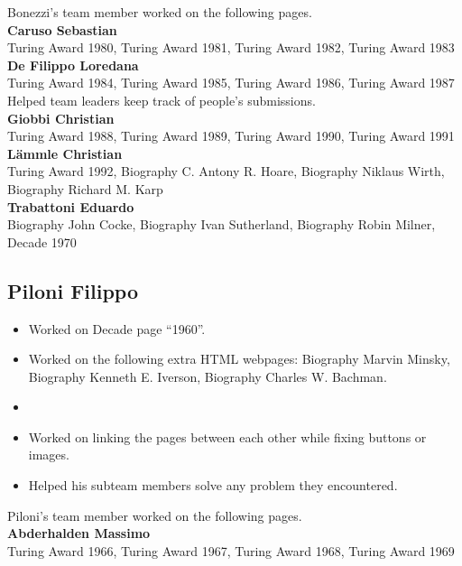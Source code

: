 \documentclass[11pt]{article}
\begin{document}
\noindent Bonezzi's team member worked on the following pages.\\

\noindent\textbf{Caruso Sebastian}\\ 
Turing Award 1980, Turing Award 1981, Turing Award 1982, Turing Award 1983\\

\noindent\textbf{De Filippo Loredana}\\
Turing Award 1984, Turing Award 1985, Turing Award 1986, Turing Award 1987\\
Helped team leaders keep track of people's submissions.\\

\noindent\textbf{Giobbi Christian}\\
Turing Award 1988, Turing Award 1989, Turing Award 1990, Turing Award 1991\\

\noindent\textbf{Lämmle Christian}\\
Turing Award 1992, Biography C. Antony R. Hoare, Biography Niklaus Wirth, Biography Richard M. Karp\\

\noindent\textbf{Trabattoni Eduardo}\\
Biography John Cocke, Biography Ivan Sutherland, Biography Robin Milner, Decade 1970

\subsection*{Piloni Filippo}
\begin{itemize}
 \item Worked on Decade page ``1960''.
 \item Worked on the following extra HTML webpages: Biography Marvin Minsky, Biography Kenneth E. Iverson, Biography Charles W. Bachman.
 \item 
 \item Worked on linking the pages between each other while fixing buttons or images.
 \item Helped his subteam members solve any problem they encountered.
\end{itemize}

\noindent Piloni's team member worked on the following pages.\\

\noindent\textbf{Abderhalden Massimo}\\
Turing Award 1966, Turing Award 1967, Turing Award 1968, Turing Award 1969\\
\end{document}
